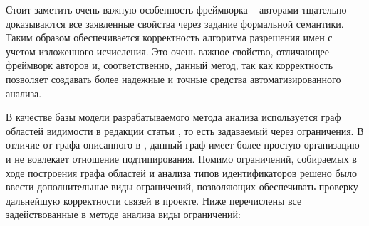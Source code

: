 Стоит заметить очень важную особенность фреймворка -- авторами тщательно доказываются все заявленные свойства
через задание формальной семантики. Таким образом обеспечивается корректность алгоритма разрешения имен с учетом
изложенного исчисления. Это очень важное свойство, отличающее фреймворк авторов и, соответственно, данный метод,
так как корректность позволяет создавать более надежные и точные средства автоматизированного анализа.

В качестве базы модели разрабатываемого метода анализа используется граф областей видимости в редакции статьи \cite{scope-graphs-static-analysis}
, то есть задаваемый через ограничения. В отличие от графа описанного в \cite{scope-graphs-typed},
данный граф имеет более простую организацию и не вовлекает отношение подтипирования. Помимо ограничений, собираемых
в ходе построения графа областей и анализа типов идентификаторов решено было ввести дополнительные виды ограничений,
позволяющих обеспечивать проверку дальнейшую корректности связей в проекте. Ниже перечислены все задействованные
в методе анализа виды ограничений:

\renewcommand{\labelenumi}{\arabic{enumi})}
\renewcommand{\labelenumii}{\asbuk{enumii})}

